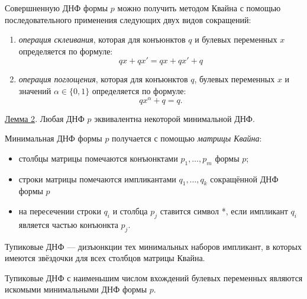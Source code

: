 Совершненную ДНФ формы $p$ можно получить $\textit{методом Квайна}$ с помощью последовательного применения следующих двух видов сокращений:
\begin{enumerate}
    \item \textit{операция склеивания}, которая для конъюнктов $q$ и булевых переменных $x$ определяется по формуле: $$qx + qx' = qx + qx' + q$$
    \item \textit{операция поглощения}, которая для конъюнктов $q$, булевых переменных $x$ и значений $\alpha \in \{0, 1\}$ определяется по формуле: $$qx^\alpha + q = q.$$
\end{enumerate}

\underline{Лемма 2}. Любая ДНФ $p$ эквивалентна некоторой минимальной ДНФ.

Минимальная ДНФ формы $p$ получается с помощью \textit{матрицы Квайна}:
\begin{itemize}
    \item столбцы матрицы помечаются конъюнктами $p_1, \dots, p_m$ формы $p$;
    \item строки матрицы помечаются импликантами $q_1,\dots,q_k$ сокращённой ДНФ формы $p$
    \item на пересечении строки $q_i$ и столбца $p_j$ ставится символ *, если импликант $q_i$ является частью конъюнкта $p_j$.
\end{itemize}

Тупиковые ДНФ --- дизъюнкции тех минимальных наборов импликант, в которых имеются звёздочки для всех столбцов матрицы Квайна.

Тупиковые ДНФ с наименьшим числом вхождений булевых переменных являются искомыми минимальными ДНФ формы $p$.